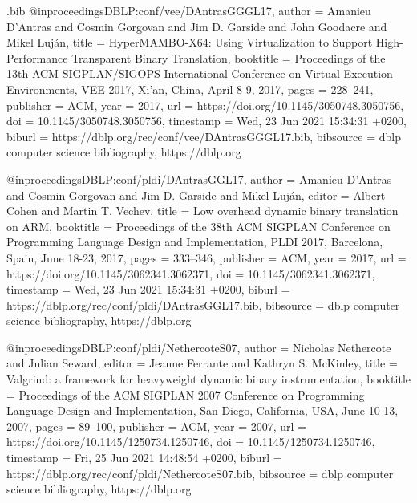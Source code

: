 \begin{filecontents}{\jobname.bib}
@inproceedings{DBLP:conf/vee/DAntrasGGGL17,
  author       = {Amanieu D'Antras and
                  Cosmin Gorgovan and
                  Jim D. Garside and
                  John Goodacre and
                  Mikel Luj{\'{a}}n},
  title        = {HyperMAMBO-X64: Using Virtualization to Support High-Performance Transparent
                  Binary Translation},
  booktitle    = {Proceedings of the 13th {ACM} {SIGPLAN/SIGOPS} International Conference
                  on Virtual Execution Environments, {VEE} 2017, Xi'an, China, April
                  8-9, 2017},
  pages        = {228--241},
  publisher    = {{ACM}},
  year         = {2017},
  url          = {https://doi.org/10.1145/3050748.3050756},
  doi          = {10.1145/3050748.3050756},
  timestamp    = {Wed, 23 Jun 2021 15:34:31 +0200},
  biburl       = {https://dblp.org/rec/conf/vee/DAntrasGGGL17.bib},
  bibsource    = {dblp computer science bibliography, https://dblp.org}
}

@inproceedings{DBLP:conf/pldi/DAntrasGGL17,
  author       = {Amanieu D'Antras and
                  Cosmin Gorgovan and
                  Jim D. Garside and
                  Mikel Luj{\'{a}}n},
  editor       = {Albert Cohen and
                  Martin T. Vechev},
  title        = {Low overhead dynamic binary translation on {ARM}},
  booktitle    = {Proceedings of the 38th {ACM} {SIGPLAN} Conference on Programming
                  Language Design and Implementation, {PLDI} 2017, Barcelona, Spain,
                  June 18-23, 2017},
  pages        = {333--346},
  publisher    = {{ACM}},
  year         = {2017},
  url          = {https://doi.org/10.1145/3062341.3062371},
  doi          = {10.1145/3062341.3062371},
  timestamp    = {Wed, 23 Jun 2021 15:34:31 +0200},
  biburl       = {https://dblp.org/rec/conf/pldi/DAntrasGGL17.bib},
  bibsource    = {dblp computer science bibliography, https://dblp.org}
}

@inproceedings{DBLP:conf/pldi/NethercoteS07,
  author       = {Nicholas Nethercote and
                  Julian Seward},
  editor       = {Jeanne Ferrante and
                  Kathryn S. McKinley},
  title        = {Valgrind: a framework for heavyweight dynamic binary instrumentation},
  booktitle    = {Proceedings of the {ACM} {SIGPLAN} 2007 Conference on Programming
                  Language Design and Implementation, San Diego, California, USA, June
                  10-13, 2007},
  pages        = {89--100},
  publisher    = {{ACM}},
  year         = {2007},
  url          = {https://doi.org/10.1145/1250734.1250746},
  doi          = {10.1145/1250734.1250746},
  timestamp    = {Fri, 25 Jun 2021 14:48:54 +0200},
  biburl       = {https://dblp.org/rec/conf/pldi/NethercoteS07.bib},
  bibsource    = {dblp computer science bibliography, https://dblp.org}
}


\end{filecontents}
